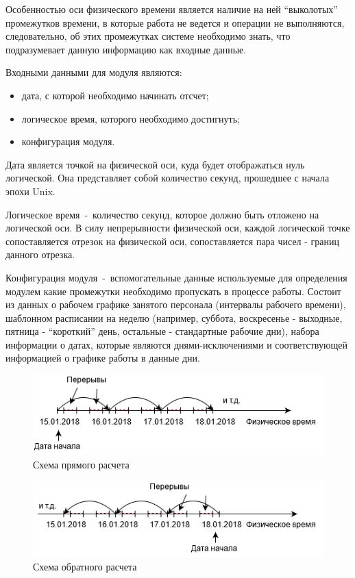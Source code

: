 \indent Особенностью оси физического времени является наличие на ней ``выколотых'' промежутков времени, в которые работа не ведется и операции не выполняются, следовательно, об этих промежутках системе необходимо знать, что подразумевает данную информацию как входные данные.

\indent Входными данными для модуля являются:

\begin{itemize}
	\item дата, с которой необходимо начинать отсчет;
	\item логическое время, которого необходимо достигнуть;
	\item конфигурация модуля.
\end{itemize}

\indent Дата является точкой на физической оси, куда будет отображаться нуль логической. Она представляет собой количество секунд, прошедшее с начала эпохи Unix.

\indent Логическое время~-~количество секунд, которое должно быть отложено на логической оси. В силу непрерывности физической оси, каждой логической точке сопоставляется отрезок на физической оси, сопоставляется пара чисел - границ данного отрезка.

\indent Конфигурация модуля~-~вспомогательные данные используемые для определения модулем какие промежутки необходимо пропускать в процессе работы.
Состоит из данных о рабочем графике занятого персонала (интервалы рабочего времени), шаблонном расписании на неделю (например, суббота, воскресенье - выходные, пятница - ``короткий'' день, остальные - стандартные рабочие дни), набора информации о датах, которые являются днями-исключениями и соответствующей информацией о графике работы в данные дни.
\begin{figure}[h!]
	\centering
	\includegraphics[width=0.7\linewidth]{pics/scheduleStraightCalc.png}
	\caption{Схема прямого расчета}
	\label{fig:straightCalc}
\end{figure}
\begin{figure}[h!]
	\centering
	\includegraphics[width=0.7\linewidth]{pics/scheduleReverceCalc.png}
	\caption{Схема обратного расчета}
	\label{fig:reverceCalc}
\end{figure}

